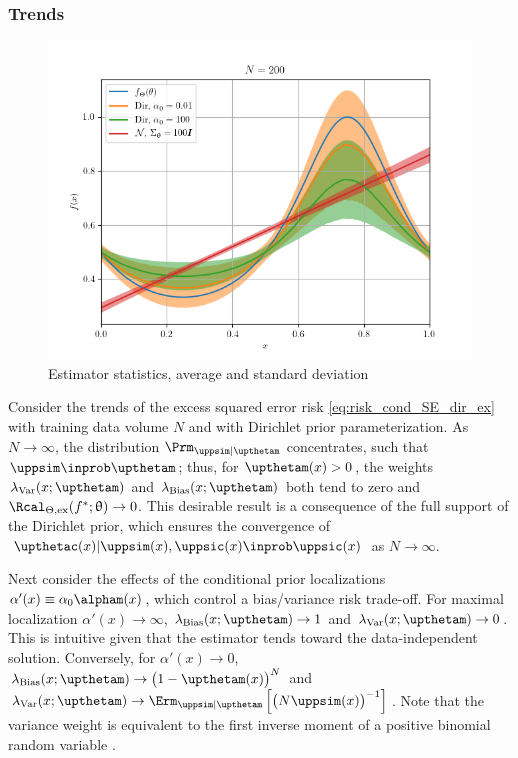 \documentclass{article}
\begin{document}
	
	
	
	\subsubsection{Trends}
	
	\begin{figure}
		\centering
		\includegraphics[width=1\linewidth]{SSP_2021/Predict_SE_biased_hard.png}
		\caption{Estimator statistics, average and standard deviation}
		\label{fig:Predict_SE_biased_hard}
	\end{figure}
	
	Consider the trends of the excess squared error risk \eqref{eq:risk_cond_SE_dir_ex} with training data volume $N$ and with Dirichlet prior parameterization. As $N \to \infty$, the distribution $\Prm_{\uppsim | \upthetam}$ concentrates, such that $\uppsim \inprob \upthetam$; thus, for $\upthetam(x) > 0$, the weights $\lambda_{\text{Var}}(x; \upthetam)$ and $\lambda_{\text{Bias}}(x; \upthetam)$ both tend to zero and $\Rcal_{\Theta, \mathrm{ex}}(f^* ; \uptheta) \to 0$. This desirable result is a consequence of the full support of the Dirichlet prior, which ensures the convergence of $\upthetac(x) | \uppsim(x),\uppsic(x) \inprob \uppsic(x)$ as $N \to \infty$.
	
	Next consider the effects of the conditional prior localizations $\alpha'(x) \equiv \alpha_0 \alpham(x)$, which control a bias/variance risk trade-off. For maximal localization $\alpha'(x) \to \infty$, $\lambda_{\text{Bias}}(x; \upthetam) \to 1$ and $\lambda_{\text{Var}}(x; \upthetam) \to 0$. This is intuitive given that the estimator tends toward the data-independent solution. Conversely, for $\alpha'(x) \to 0$, $\lambda_{\text{Bias}}(x; \upthetam) \to \big( 1 - \upthetam(x) \big)^N$ and $\lambda_{\text{Var}}(x; \upthetam) \to \Erm_{\uppsim | \upthetam}\left[ \big( N \uppsim(x) \big)^{-1} \right]$. Note that the variance weight is equivalent to the first inverse moment of a positive binomial random variable \cite{stephan}.
	
\end{document}
